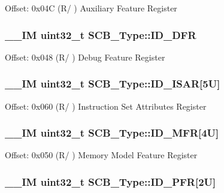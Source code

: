 Offset\-: 0x04\-C (R/ ) Auxiliary Feature Register \hypertarget{struct_s_c_b___type_ada1d3119c020983fdc949c2ccd406caa}{
\subsubsection[{I\-D\-\_\-\-D\-F\-R}]{\setlength{\rightskip}{0pt plus 5cm}\-\_\-\-\_\-\-I\-M uint32\-\_\-t S\-C\-B\-\_\-\-Type\-::\-I\-D\-\_\-\-D\-F\-R}}\label{struct_s_c_b___type_ada1d3119c020983fdc949c2ccd406caa}
Offset\-: 0x048 (R/ ) Debug Feature Register \hypertarget{struct_s_c_b___type_ac729a357cdd968020fdb5c35bdfc4916}{
\subsubsection[{I\-D\-\_\-\-I\-S\-A\-R}]{\setlength{\rightskip}{0pt plus 5cm}\-\_\-\-\_\-\-I\-M uint32\-\_\-t S\-C\-B\-\_\-\-Type\-::\-I\-D\-\_\-\-I\-S\-A\-R\mbox{[}5\-U\mbox{]}}}\label{struct_s_c_b___type_ac729a357cdd968020fdb5c35bdfc4916}
Offset\-: 0x060 (R/ ) Instruction Set Attributes Register \hypertarget{struct_s_c_b___type_a781ef24d88610a432e7d5b179d78de47}{
\subsubsection[{I\-D\-\_\-\-M\-F\-R}]{\setlength{\rightskip}{0pt plus 5cm}\-\_\-\-\_\-\-I\-M uint32\-\_\-t S\-C\-B\-\_\-\-Type\-::\-I\-D\-\_\-\-M\-F\-R\mbox{[}4\-U\mbox{]}}}\label{struct_s_c_b___type_a781ef24d88610a432e7d5b179d78de47}
Offset\-: 0x050 (R/ ) Memory Model Feature Register \hypertarget{struct_s_c_b___type_ab35c6b650d3bb2d11259c0a0285d0d00}{
\subsubsection[{I\-D\-\_\-\-P\-F\-R}]{\setlength{\rightskip}{0pt plus 5cm}\-\_\-\-\_\-\-I\-M uint32\-\_\-t S\-C\-B\-\_\-\-Type\-::\-I\-D\-\_\-\-P\-F\-R\mbox{[}2\-U\mbox{]}}}\label{struct_s_c_b___type_ab35c6b650d3bb2d11259c0a0285d0d00}
